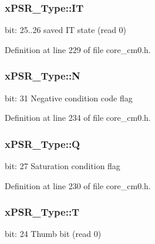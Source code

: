 \hypertarget{unionx_p_s_r___type_a3200966922a194d84425e2807a7f1328}{
\subsubsection[{I\-T}]{ x\-P\-S\-R\-\_\-\-Type\-::\-I\-T}}\label{unionx_p_s_r___type_a3200966922a194d84425e2807a7f1328}
bit\-: 25..26 saved I\-T state (read 0) 

Definition at line 229 of file core\-\_\-cm0.\-h.

\hypertarget{unionx_p_s_r___type_a2db9a52f6d42809627d1a7a607c5dbc5}{
\subsubsection[{N}]{ x\-P\-S\-R\-\_\-\-Type\-::\-N}}\label{unionx_p_s_r___type_a2db9a52f6d42809627d1a7a607c5dbc5}
bit\-: 31 Negative condition code flag 

Definition at line 234 of file core\-\_\-cm0.\-h.

\hypertarget{unionx_p_s_r___type_add7cbd2b0abd8954d62cd7831796ac7c}{
\subsubsection[{Q}]{ x\-P\-S\-R\-\_\-\-Type\-::\-Q}}\label{unionx_p_s_r___type_add7cbd2b0abd8954d62cd7831796ac7c}
bit\-: 27 Saturation condition flag 

Definition at line 230 of file core\-\_\-cm0.\-h.

\hypertarget{unionx_p_s_r___type_a7eed9fe24ae8d354cd76ae1c1110a658}{
\subsubsection[{T}]{ x\-P\-S\-R\-\_\-\-Type\-::\-T}}\label{unionx_p_s_r___type_a7eed9fe24ae8d354cd76ae1c1110a658}
bit\-: 24 Thumb bit (read 0) 

